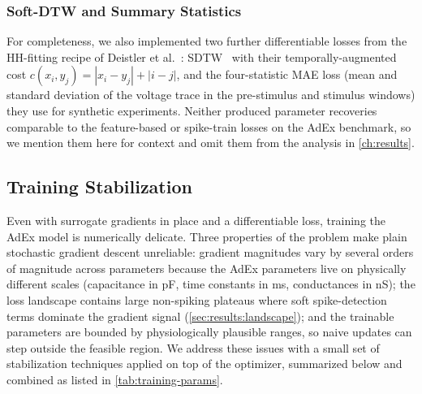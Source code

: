 \subsubsection{Soft-DTW and Summary Statistics}\label{sec:method:opt:loss:misc}
For completeness, we also implemented two further differentiable losses from the \gls{HH}-fitting recipe of Deistler et al.~\cite{Deistler2025}:
\gls{SDTW}~\cite{Blondel2018} with their temporally-augmented cost $c(x_i, y_j) = |x_i - y_j| + |i - j|$, and the four-statistic \gls{MAE} loss (mean and standard deviation of the voltage trace in the pre-stimulus and stimulus windows) they use for synthetic experiments.
Neither produced parameter recoveries comparable to the feature-based or spike-train losses on the \gls{AdEx} benchmark, so we mention them here for context and omit them from the analysis in \cref{ch:results}.


\subsection{Training Stabilization}\label{sec:method:opt:stabilization}
Even with surrogate gradients in place and a differentiable loss, training the \gls{AdEx} model is numerically delicate.
Three properties of the problem make plain stochastic gradient descent unreliable:
gradient magnitudes vary by several orders of magnitude across parameters because the \gls{AdEx} parameters live on physically different scales (capacitance in pF, time constants in ms, conductances in nS);
the loss landscape contains large non-spiking plateaus where soft spike-detection terms dominate the gradient signal (\cref{sec:results:landscape});
and the trainable parameters are bounded by physiologically plausible ranges, so naive updates can step outside the feasible region.
We address these issues with a small set of stabilization techniques applied on top of the optimizer, summarized below and combined as listed in \cref{tab:training-params}.

